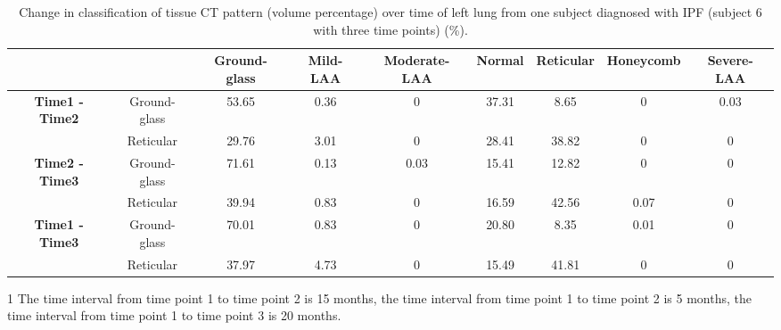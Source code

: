 \begin{landscape}
\begin{table}[p]
\centering
\caption{Change in classification of tissue CT pattern (volume percentage) over time of left lung from one subject diagnosed with IPF (subject 6 with three time points) (\%).}
\label{tab:ChangeOverTimeLeft}
\begin{tabular}{c c c c c c c c c}
\hline
\quad & \quad & \bf{Ground-glass} &	\bf{Mild-LAA} &	\bf{Moderate-LAA} &	\bf{Normal} &	\bf{Reticular} &	\bf{Honeycomb} &	\bf{Severe-LAA}\\
\hline
\bf{Time1 - Time2} &	Ground-glass &	53.65 &	0.36 &	0	& 37.31 &	8.65 &	0 &	0.03\\
\quad & Reticular	& 29.76 &	3.01 &	0 &	28.41 &	38.82 &	0 &	0\\
\hline
\bf{Time2 - Time3} &	Ground-glass &	71.61 &	0.13 &	0.03 &	15.41 &	12.82 &	0 &	0\\
\quad & Reticular &	39.94 &	0.83 &	0 &	16.59 &	42.56 &	0.07 &	0\\
\hline
\bf{Time1 - Time3} &	Ground-glass &	70.01 &	0.83 &	0 &	20.80 &	8.35 &	0.01 &	0\\
\quad & Reticular &	37.97 &	4.73 &	0 &	15.49 &	41.81 &	0 &	0\\
\hline
\end{tabular}
\begin{tablenotes}
  \item[1] The time interval from time point 1 to time point 2 is 15 months, the time interval from time point 1 to time point 2 is 5 months, the time interval from time point 1 to time point 3 is 20 months.
\end{tablenotes}
\end{table}


\end{landscape}
